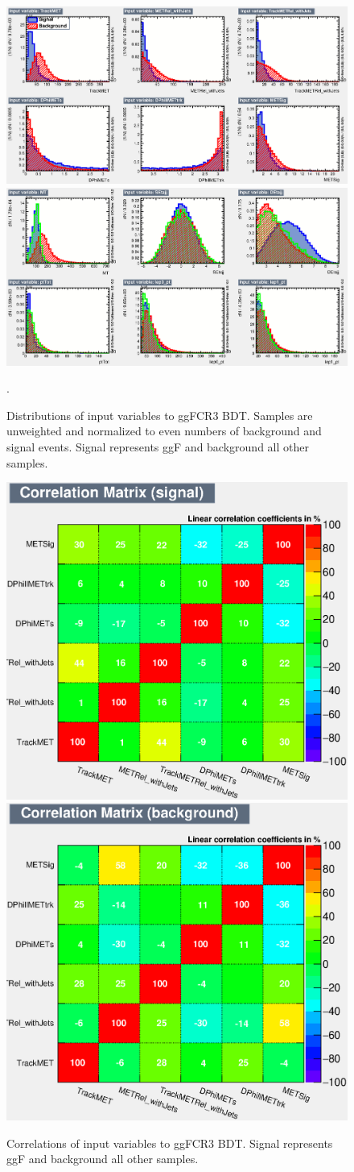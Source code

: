\begin{figure}[!htbp]
    \centering
    \includegraphics[width=0.45\linewidth]{Pictures/variables_id_c1.eps}
    \includegraphics[width=0.45\linewidth]{Pictures/variables_id_c2.eps}
    \caption{Distributions of input variables to ggFCR3 BDT. Samples are unweighted and normalized to even numbers of background and signal events. Signal represents ggF and background all other samples.}.
    \label{fig:ggFCR3BDTinput}
\end{figure}
\begin{figure}[!htbp]
\centering
  \includegraphics[width=.4\linewidth]{Pictures/CorrelationMatrixS.eps}
  \includegraphics[width=.4\linewidth]{Pictures/CorrelationMatrixB.eps}
\caption{Correlations of input variables to ggFCR3 BDT. Signal represents ggF and background all other samples.}
\label{fig:ggFCR3corrSB}
\end{figure}

